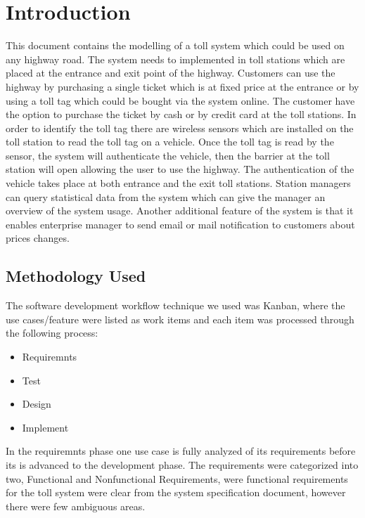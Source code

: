\chapter{Introduction}
\noindent
This document contains the modelling of a toll system which could be used on any highway road. The system needs to implemented in toll stations which are placed at the entrance and exit point of the highway. Customers can use the highway by purchasing a single ticket which is at fixed price at the entrance or by using a toll tag which could be bought via the system online. The customer have the option to purchase the ticket by cash or by credit card at the toll stations. In order to identify the toll tag there are wireless sensors which are installed on the toll station to read the toll tag on a vehicle. Once the toll tag is read by the sensor, the system will authenticate the vehicle, then the barrier at the toll station will open allowing the user to use the highway. The authentication of the vehicle takes place at both entrance and the exit toll stations. Station managers can query statistical data from the system which can give the manager an overview of the system usage. Another additional feature of the system is that it enables enterprise manager to send email or mail notification to customers about prices changes.
\section{Methodology Used}

The software development workflow technique we used was Kanban, where the use cases/feature were listed as work items and each item was processed through the following process:

\begin{itemize}
  \item Requiremnts 
  \item Test
  \item Design
  \item Implement
\end{itemize}


In the requiremnts phase one use case is fully analyzed of its requirements before its is advanced to the development phase. The requirements were categorized into two, Functional and Nonfunctional Requirements, were functional requirements for the toll system were clear from the system specification document, however there were few ambiguous areas. 

